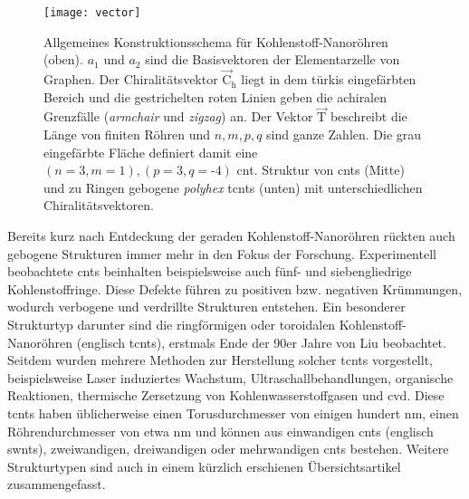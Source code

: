 \begin{figure}[ht!]
	\centering
	\texttt{[image: vector]}
	\captionsetup{figurewithin = chapter}
	\captionsetup{font=small, labelfont=bf}\caption[Konstruktionsschema von (toroidalen \textit{polyhex}) Kohlenstoff-Nanoröhren]{Allgemeines Konstruktionsschema für Kohlenstoff-Nanoröhren (oben). $a_1$ und $a_2$ sind die Basisvektoren der Elementarzelle von Graphen. Der Chiralitätsvektor $\vec{\text{C}}_\text{h}$ liegt in dem türkis eingefärbten Bereich und die gestrichelten roten Linien geben die achiralen Grenzfälle (\textit{armchair} und \textit{zigzag}) an. Der Vektor $\vec{\text{T}}$ beschreibt die Länge von finiten Röhren und $n,m,p,q$ sind ganze Zahlen. Die grau eingefärbte Fläche definiert damit eine $(n=3,m=1),(p=3,q=\textrm{-}4)$ \ac{cnt}. Struktur von \acp{cnt} (Mitte) und zu Ringen gebogene \textit{polyhex} \acp{tcnt} (unten) mit unterschiedlichen Chiralitätsvektoren.}
\label{abb:chiralvector}
\end{figure}

Bereits kurz nach Entdeckung der geraden Kohlenstoff-Nanoröhren rückten auch gebogene Strukturen immer mehr in den Fokus der Forschung. Experimentell beobachtete \acp{cnt} beinhalten beispielsweise auch fünf- und siebengliedrige Kohlenstoffringe.\supercite{ichihashi1992pentagons} Diese Defekte führen zu positiven bzw. negativen Krümmungen, wodurch verbogene und verdrillte Strukturen entstehen. Ein besonderer Strukturtyp darunter sind die ringförmigen oder toroidalen Kohlenstoff-Nanoröhren (englisch \acfp{tcnt}), erstmals Ende der 90er Jahre von Liu\supercite{liu1997c} beobachtet. Seitdem wurden mehrere Methoden zur Herstellung solcher \acp{tcnt} vorgestellt, beispielsweise Laser induziertes Wachstum,\supercite{liu1997c} Ultraschallbehandlungen,\supercite{martel1999rings,martel1999ring} organische Reaktionen,\supercite{sano2001ring,geng2008synthesis} thermische Zersetzung von Kohlenwasserstoffgasen\supercite{ahlskog1999ring} und \ac{cvd}\supercite{song2006large,zhou2006ring}. Diese \acp{tcnt} haben üblicherweise einen Torusdurchmesser von einigen hundert nm, einen Röhrendurchmesser von etwa \unit[5-20]{nm} und können aus einwandigen \acp{cnt} (englisch \acp{swnt}),\supercite{martel1999rings,martel1999ring,sano2001ring,geng2008synthesis,komatsu2006ultrasonic,guo2007spontaneously} zweiwandigen,\supercite{colomer2003rings} dreiwandigen\supercite{yu2006rings} oder mehrwandigen\supercite{ahlskog1999ring} \acp{cnt} bestehen. Weitere Strukturtypen sind auch in einem kürzlich erschienen Übersichtsartikel\supercite{liu2014curved} zusammengefasst.


